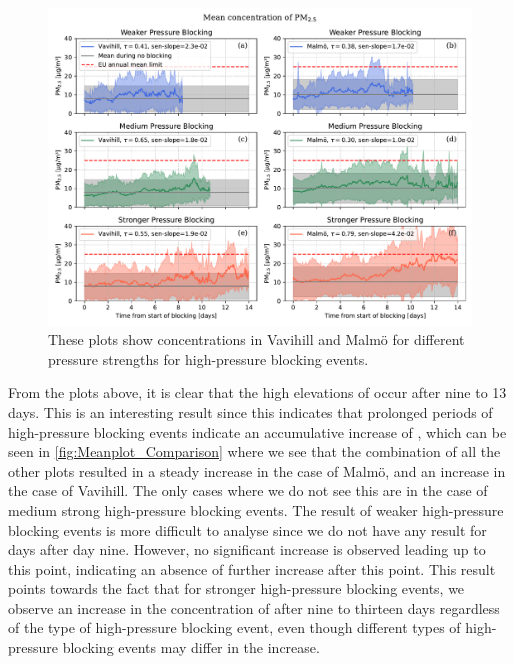 \begin{figure}[H]
    \centering
    \includegraphics[width=\textwidth]{Figures/Meanplot_pressure.pdf}
    \caption{These plots show \PM concentrations in Vavihill and Malmö for different pressure strengths for high-pressure blocking events.}
    \label{fig:Meanplot_pressure}
\end{figure}


From the plots above, it is clear that the high elevations of \PM  occur after nine to 13 days. This is an interesting result since this indicates that prolonged periods of high-pressure blocking events indicate an accumulative increase of \PM, which can be seen in \autoref{fig:Meanplot_Comparison} where we see that the combination of all the other plots resulted in a steady increase in the case of Malmö, and an increase in the case of Vavihill. The only cases where we do not see this are in the case of medium strong high-pressure blocking events. The result of weaker high-pressure blocking events is more difficult to analyse since we do not have any result for days after day nine. However, no significant increase is observed leading up to this point, indicating an absence of further increase after this point. This result points towards the fact that for stronger high-pressure blocking events, we observe an increase in the concentration of \PM  after nine to thirteen days regardless of the type of high-pressure blocking event, even though different types of high-pressure blocking events may differ in the increase.

